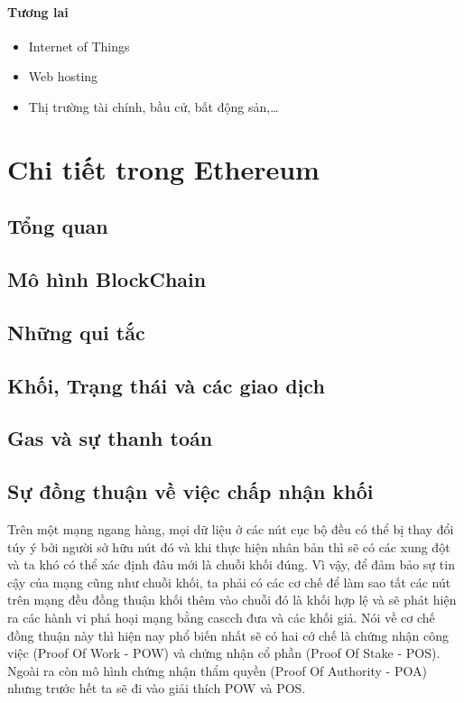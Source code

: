 \documentclass[12pt]{article}
\begin{document}
		\paragraph{Tương lai}
		\begin{itemize}
			\item Internet of Things
			
			\item Web hosting
			
			\item Thị trường tài chính, bầu cử, bất động sản,…
			
			
		\end{itemize}
	\newpage
	
	\section{Chi tiết trong Ethereum}
	
	\subsection{Tổng quan}
	
	\subsection{Mô hình BlockChain}
	
	\subsection{Những qui tắc}
	
	\subsection{Khối, Trạng thái và các giao dịch}
	
	\subsection{Gas và sự thanh toán}
	
	\subsection{Sự đồng thuận về việc chấp nhận khối}
	Trên một mạng ngang hàng, mọi dữ liệu ở các nút cục bộ đều có thể bị thay đổi túy ý bởi người sở hữu nút đó và khi thực hiện nhân bản thì sẽ có các xung đột và ta khó có thể xác định đâu mới là chuỗi khối đúng. Vì vậy, để đảm bảo sự tin cậy của mạng cũng như chuỗi khối, ta phải có các cơ chế để làm sao tất các nút trên mạng đều đồng thuận khối thêm vào chuỗi đó là khối hợp lệ và sẽ phát hiện ra các hành vi phá hoại mạng bằng cascch đưa và các khối giả. Nói về cơ chế đồng thuận này thì hiện nay phổ biến nhất sẽ có hai cớ chế là chứng nhận công việc  (Proof Of Work - POW) và chứng nhận cổ phần (Proof Of Stake - POS). Ngoài ra còn mô hình chứng nhận thẩm quyền (Proof Of Authority - POA) nhưng trước hết ta sẽ đi vào giải thích POW và POS.
\end{document}
